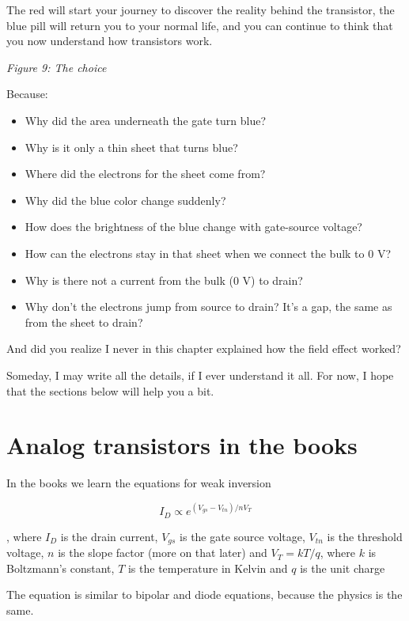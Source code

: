 The red will start your journey to discover the reality behind the
transistor, the blue pill will return you to your normal life, and you
can continue to think that you now understand how transistors work.


{
\centering
{}
}

\emph{Figure 9: The choice}

Because:

\begin{itemize}
\tightlist
\item
  Why did the area underneath the gate turn blue?
\item
  Why is it only a thin sheet that turns blue?
\item
  Where did the electrons for the sheet come from?
\item
  Why did the blue color change suddenly?
\item
  How does the brightness of the blue change with gate-source voltage?
\item
  How can the electrons stay in that sheet when we connect the bulk to 0
  V?
\item
  Why is there not a current from the bulk (0 V) to drain?
\item
  Why don't the electrons jump from source to drain? It's a gap, the
  same as from the sheet to drain?
\end{itemize}

And did you realize I never in this chapter explained how the field
effect worked?

Someday, I may write all the details, if I ever understand it all. For
now, I hope that the sections below will help you a bit.

\section{Analog transistors in the
books}\label{analog-transistors-in-the-books}

In the books we learn the equations for weak inversion

\[ I_D \propto e^{(V_{gs}-V_{tn})/nV_T}\]

, where \(I_D\) is the drain current, \(V_{gs}\) is the gate source
voltage, \(V_{tn}\) is the threshold voltage, \(n\) is the slope factor
(more on that later) and \(V_T = kT/q\), where \(k\) is Boltzmann's
constant, \(T\) is the temperature in Kelvin and \(q\) is the unit
charge

The equation is similar to bipolar and diode equations, because the
physics is the same.

